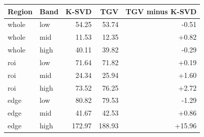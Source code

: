 \begin{tabular}{llrrr}
\toprule
Region & Band & K-SVD & TGV & TGV minus K-SVD \\
\midrule
whole & low & 54.25 & 53.74 & -0.51 \\
whole & mid & 11.53 & 12.35 & +0.82 \\
whole & high & 40.11 & 39.82 & -0.29 \\
\midrule
roi & low & 71.64 & 71.82 & +0.19 \\
roi & mid & 24.34 & 25.94 & +1.60 \\
roi & high & 73.52 & 76.25 & +2.72 \\
\midrule
edge & low & 80.82 & 79.53 & -1.29 \\
edge & mid & 41.67 & 42.53 & +0.86 \\
edge & high & 172.97 & 188.93 & +15.96 \\
\bottomrule
\end{tabular}
